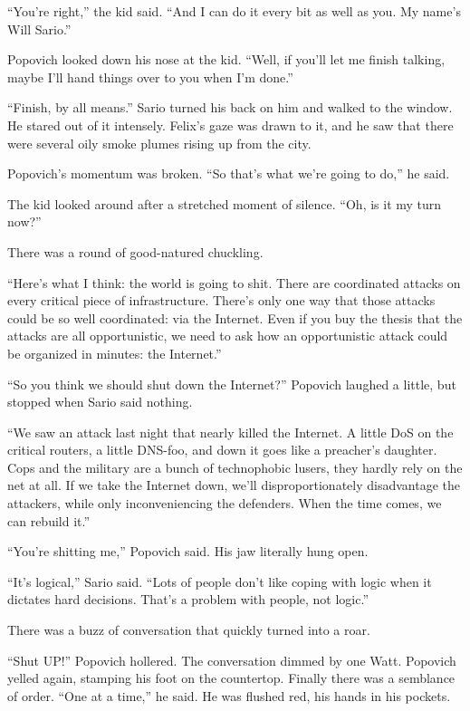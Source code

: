 “You’re right,” the kid said. “And I can do it every bit as well as
you. My name’s Will Sario.”

Popovich looked down his nose at the kid. “Well, if you’ll let me
finish talking, maybe I’ll hand things over to you when I’m done.”

“Finish, by all means.” Sario turned his back on him and walked to
the window. He stared out of it intensely. Felix’s gaze was drawn
to it, and he saw that there were several oily smoke plumes rising
up from the city.

Popovich’s momentum was broken. “So that’s what we’re going to do,”
he said.

The kid looked around after a stretched moment of silence. “Oh, is
it my turn now?”

There was a round of good-natured chuckling.

“Here’s what I think: the world is going to shit. There are
coordinated attacks on every critical piece of infrastructure.
There’s only one way that those attacks could be so well
coordinated: via the Internet. Even if you buy the thesis that the
attacks are all opportunistic, we need to ask how an opportunistic
attack could be organized in minutes: the Internet.”

“So you think we should shut down the Internet?” Popovich laughed a
little, but stopped when Sario said nothing.

“We saw an attack last night that nearly killed the Internet. A
little DoS on the critical routers, a little DNS-foo, and down it
goes like a preacher’s daughter. Cops and the military are a bunch
of technophobic lusers, they hardly rely on the net at all. If we
take the Internet down, we’ll disproportionately disadvantage the
attackers, while only inconveniencing the defenders. When the time
comes, we can rebuild it.”

“You’re shitting me,” Popovich said. His jaw literally hung open.

“It’s logical,” Sario said. “Lots of people don’t like coping with
logic when it dictates hard decisions. That’s a problem with
people, not logic.”

There was a buzz of conversation that quickly turned into a roar.

“Shut UP!” Popovich hollered. The conversation dimmed by one Watt.
Popovich yelled again, stamping his foot on the countertop. Finally
there was a semblance of order. “One at a time,” he said. He was
flushed red, his hands in his pockets.

